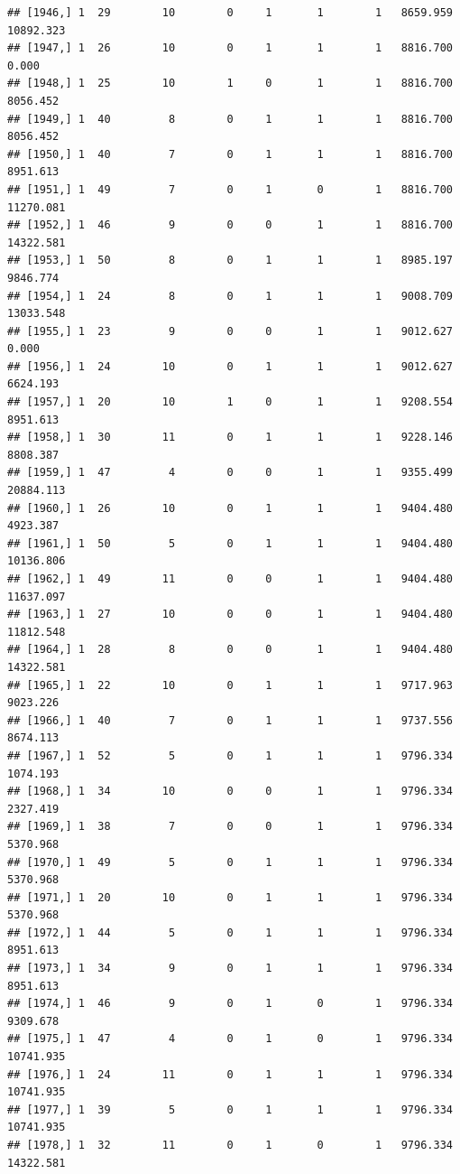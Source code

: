 \documentclass[
]{article}
\begin{document}
\begin{verbatim}
## [1946,] 1  29        10        0     1       1        1   8659.959  10892.323
## [1947,] 1  26        10        0     1       1        1   8816.700      0.000
## [1948,] 1  25        10        1     0       1        1   8816.700   8056.452
## [1949,] 1  40         8        0     1       1        1   8816.700   8056.452
## [1950,] 1  40         7        0     1       1        1   8816.700   8951.613
## [1951,] 1  49         7        0     1       0        1   8816.700  11270.081
## [1952,] 1  46         9        0     0       1        1   8816.700  14322.581
## [1953,] 1  50         8        0     1       1        1   8985.197   9846.774
## [1954,] 1  24         8        0     1       1        1   9008.709  13033.548
## [1955,] 1  23         9        0     0       1        1   9012.627      0.000
## [1956,] 1  24        10        0     1       1        1   9012.627   6624.193
## [1957,] 1  20        10        1     0       1        1   9208.554   8951.613
## [1958,] 1  30        11        0     1       1        1   9228.146   8808.387
## [1959,] 1  47         4        0     0       1        1   9355.499  20884.113
## [1960,] 1  26        10        0     1       1        1   9404.480   4923.387
## [1961,] 1  50         5        0     1       1        1   9404.480  10136.806
## [1962,] 1  49        11        0     0       1        1   9404.480  11637.097
## [1963,] 1  27        10        0     0       1        1   9404.480  11812.548
## [1964,] 1  28         8        0     0       1        1   9404.480  14322.581
## [1965,] 1  22        10        0     1       1        1   9717.963   9023.226
## [1966,] 1  40         7        0     1       1        1   9737.556   8674.113
## [1967,] 1  52         5        0     1       1        1   9796.334   1074.193
## [1968,] 1  34        10        0     0       1        1   9796.334   2327.419
## [1969,] 1  38         7        0     0       1        1   9796.334   5370.968
## [1970,] 1  49         5        0     1       1        1   9796.334   5370.968
## [1971,] 1  20        10        0     1       1        1   9796.334   5370.968
## [1972,] 1  44         5        0     1       1        1   9796.334   8951.613
## [1973,] 1  34         9        0     1       1        1   9796.334   8951.613
## [1974,] 1  46         9        0     1       0        1   9796.334   9309.678
## [1975,] 1  47         4        0     1       0        1   9796.334  10741.935
## [1976,] 1  24        11        0     1       1        1   9796.334  10741.935
## [1977,] 1  39         5        0     1       1        1   9796.334  10741.935
## [1978,] 1  32        11        0     1       0        1   9796.334  14322.581

\end{verbatim}
\end{document}
